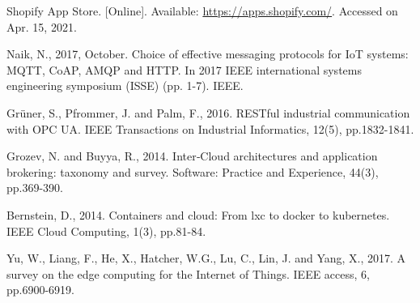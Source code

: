 \documentclass{ieeeaccess}
\begin{document}
\begin{thebibliography}{00}
 Shopify App Store. [Online]. Available: \url{https://apps.shopify.com/}. Accessed on Apr. 15, 2021.

 Naik, N., 2017, October. Choice of effective messaging protocols for IoT systems: MQTT, CoAP, AMQP and HTTP. In 2017 IEEE international systems engineering symposium (ISSE) (pp. 1-7). IEEE.

 Grüner, S., Pfrommer, J. and Palm, F., 2016. RESTful industrial communication with OPC UA. IEEE Transactions on Industrial Informatics, 12(5), pp.1832-1841.

 Grozev, N. and Buyya, R., 2014. Inter‐Cloud architectures and application brokering: taxonomy and survey. Software: Practice and Experience, 44(3), pp.369-390.

 Bernstein, D., 2014. Containers and cloud: From lxc to docker to kubernetes. IEEE Cloud Computing, 1(3), pp.81-84.

 Yu, W., Liang, F., He, X., Hatcher, W.G., Lu, C., Lin, J. and Yang, X., 2017. A survey on the edge computing for the Internet of Things. IEEE access, 6, pp.6900-6919.

\end{thebibliography}

\EOD
\end{document}
